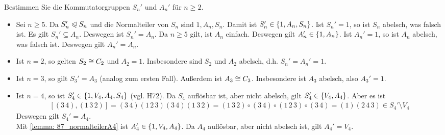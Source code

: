 \begin{exercisePage}
    \begin{exercise}
        Bestimmen Sie die Kommutatorgruppen $S_n'$ und $A_n'$ für $n \geq 2$.
    \end{exercise}
    \begin{solution}
        \begin{itemize}[leftmargin=*]
            \item Sei $n \geq 5$. Da $S_n' \mathrel{\trianglelefteqslant} S_n$ und die Normalteiler von $S_n$ sind $1, A_n, S_n$. Damit ist $S_n' \in \left\{ 1,A_n,S_n \right\}$. Ist $S_n' = 1$, so ist $S_n$ abelsch, was falsch ist. Es gilt $S_n' \subseteq A_n$. Deswegen ist $S_n' = A_n$. Da $n \geq 5$ gilt, ist $A_n$ einfach. Deswegen gilt $A_n' \in \left\{ 1,A_n \right\}$. Ist $A_n' = 1$, so ist $A_n$ abelsch, was falsch ist. Deswegen gilt $A_n' = A_n$.
            \item Ist $n = 2$, so gelten $S_2 \mathrel{\cong} C_2$ und $A_2 = 1$. Insbesondere sind $S_2$ und $A_2$ abelsch, d.h. $S_n' = A_n' = 1$.
            \item Ist $n = 3$, so gilt $S_3' = A_3$ (analog zum ersten Fall). Außerdem ist $A_3 \mathrel{\cong} C_3$. Insbesondere ist $A_3$ abelsch, also $A_3' = 1$.
            \item Ist $n = 4$, so ist $S_4' \in \left\{ 1,V_4,A_4,S_4 \right\}$ (vgl. H72). Da $S_4$ auflösbar ist, aber nicht abelsch, gilt $S_4 ' \in \left\{ V_4,A_4 \right\}$. Aber es ist
            \begin{align*}
                \left[ (3 \, 4) , (1 \, 3 \, 2) \right] = ( 3 \, 4) (1 \, 2 \, 3) (3 \, 4) (1 \, 3 \, 2) = (1 \, 3 \, 2) \circ (3 \, 4) \circ ( 1 \, 2 \, 3) \circ ( 3 \, 4) = (1) (2 \, 4 \, 3) \in S_4' \setminus V_4
            \end{align*}  
            Deswegen gilt $S_4 ' = A_4$. \\
            Mit \cref{lemma: 87_normalteilerA4} ist $A_4' \in \left\{ 1,V_4,A_4 \right\}$. Da $A_4$ auflösbar, aber nicht abelsch ist, gilt $A_4' = V_4$.
        \end{itemize}
    \end{solution}


\end{exercisePage}
